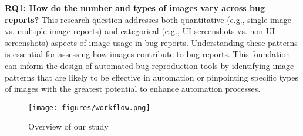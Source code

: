 
\noindent
\textbf{RQ1: How do the number and types of images vary across bug reports?}
%
This research question addresses both quantitative (e.g., single-image vs. multiple-image reports) and categorical (e.g., UI screenshots vs. non-UI screenshots) aspects of image usage in bug reports. 
%
Understanding these patterns is essential for assessing how images contribute to bug reports. This foundation can inform the design of automated bug reproduction tools by identifying image patterns that are likely to be effective in automation or pinpointing specific types of images with the greatest potential to enhance automation processes.




%

\begin{figure*}
    \centering
    \texttt{[image: figures/workflow.png]}
    \caption{Overview of our study}
    \label{fig:ovwerview}
\end{figure*}

